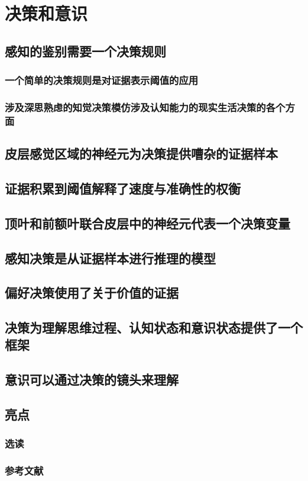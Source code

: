 \chapter{决策和意识}


\section{感知的鉴别需要一个决策规则}

\subsection{一个简单的决策规则是对证据表示阈值的应用}
\subsection{涉及深思熟虑的知觉决策模仿涉及认知能力的现实生活决策的各个方面}

\section{皮层感觉区域的神经元为决策提供嘈杂的证据样本}

\section{证据积累到阈值解释了速度与准确性的权衡}

\section{顶叶和前额叶联合皮层中的神经元代表一个决策变量}

\section{感知决策是从证据样本进行推理的模型}

\section{偏好决策使用了关于价值的证据}

\section{决策为理解思维过程、认知状态和意识状态提供了一个框架}

\section{意识可以通过决策的镜头来理解}


\section{亮点}
\subsection{选读}
\subsection{参考文献}